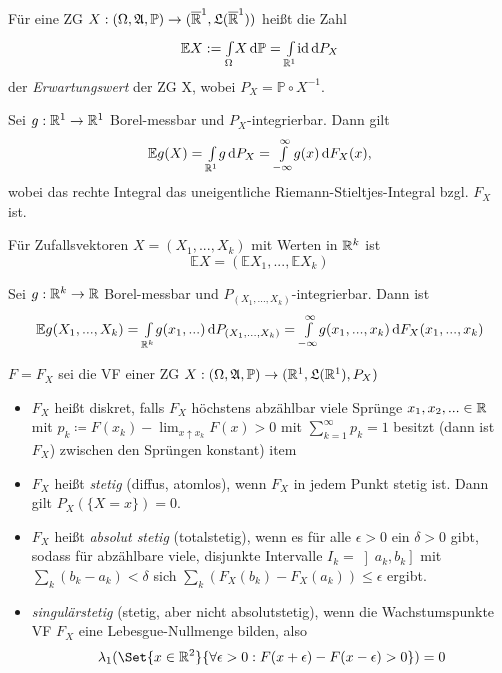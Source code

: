 \documentclass{cheat-sheet}
\newcommand{\Alg}{\mathfrak{A}} %
\newcommand{\LebAlg}{\mathfrak{L}} %
\renewcommand{\P}{\mathbb{P}}
\newcommand{\E}{\mathbb{E}} %
\newcommand{\ER}{\overline\R} %
\begin{document}
\begin{defn}
  Für eine ZG $X : (\Omega, \Alg, \P) \to (\ER^1, \LebAlg(\ER^1))$ heißt die Zahl
  \[ \E X := \Int{\Omega}{}{X}{\P} = \Int{\R^1}{}{\id}{P_X} \]
  der \emph{Erwartungswert} der ZG X, wobei $P_X = \P \circ X^{-1}$.
\end{defn}

\begin{kor}
  Sei $g : \mathbb{R}^1 \to \mathbb{R}^1$ Borel-messbar und $P_X$-integrierbar. Dann gilt
  \[ \E g(X) = \Int{\R^1}{}{g}{P_X} = \Int{- \infty}{\infty}{g(x)}{F_X(x)}, \]
  wobei das rechte Integral das uneigentliche Riemann-Stieltjes-Integral bzgl. $F_X$ ist.
\end{kor}

\begin{defn}
  Für Zufallsvektoren $X = (X_1, ..., X_k)$ mit Werten in $\mathbb{R}^k$ ist
  \[ \E X = (\E X_1, ..., \E X_k) \]
\end{defn}

Sei $g : \mathbb{R}^k \to \mathbb{R}$ Borel-messbar und $P_{(X_1, ..., X_k)}$-integrierbar. Dann ist
\[ \E g(X_1, ..., X_k) = \Int{\R^k}{}{g(x_1, ...)}{P_{(X_1, ..., X_k)}} = \Int{-\infty}{\infty}{g(x_1, ..., x_k)}{F_X(x_1, ..., x_k)} \]



$F = F_X$ sei die VF einer ZG $X : (\Omega, \Alg, \P) \to (\R^1, \LebAlg(\R^1), P_X)$

\begin{defn}
  \begin{itemize}
    \item $F_X$ heißt diskret, falls $F_X$ höchstens abzählbar viele Sprünge $x_1, x_2, ... \in \mathbb{R}$ mit $p_k \coloneqq F(x_k) - \lim_{x \uparrow x_k} F(x) > 0$ mit $\sum_{k=1}^\infty p_k = 1$ besitzt (dann ist $F_X$) zwischen den Sprüngen konstant)
    item 
    \item $F_X$ heißt \emph{stetig} (diffus, atomlos), wenn $F_X$ in jedem Punkt stetig ist. Dann gilt $P_X(\{ X = x \}) = 0$.
    \item $F_X$ heißt \emph{absolut stetig} (totalstetig), wenn es für alle $\epsilon > 0$ ein $\delta > 0$ gibt, sodass für abzählbare viele, disjunkte Intervalle $I_k = \left]a_k, b_k\right]$ mit $\sum_{k} (b_k - a_k) < \delta$ sich $\sum_{k} (F_X(b_k) - F_X(a_k)) \leq \epsilon$ ergibt.
    \item \emph{singulärstetig} (stetig, aber nicht absolutstetig), wenn die Wachstumspunkte VF $F_X$ eine Lebesgue-Nullmenge bilden, also
    \[ \lambda_1(\Set{ x \in \R^2 }{ \forall \epsilon > 0 : F(x+\epsilon)- F(x-\epsilon) > 0 }) = 0 \]
  \end{itemize}
\end{defn}
\end{document}
